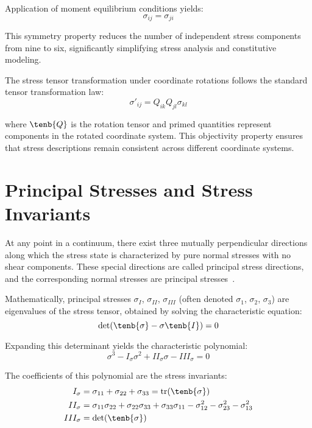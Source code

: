 Application of moment equilibrium conditions yields:
\begin{equation}
\sigma_{ij} = \sigma_{ji}
\end{equation}

This symmetry property reduces the number of independent stress components from nine to six, significantly simplifying stress analysis and constitutive modeling.

The stress tensor transformation under coordinate rotations follows the standard tensor transformation law:
\begin{equation}
\sigma'_{ij} = Q_{ik}Q_{jl}\sigma_{kl}
\end{equation}

where $\tenb{Q}$ is the rotation tensor and primed quantities represent components in the rotated coordinate system. This objectivity property ensures that stress descriptions remain consistent across different coordinate systems.

\section{Principal Stresses and Stress Invariants}

At any point in a continuum, there exist three mutually perpendicular directions along which the stress state is characterized by pure normal stresses with no shear components. These special directions are called principal stress directions, and the corresponding normal stresses are principal stresses~\autocite{Sadd.2019}.

Mathematically, principal stresses $\sigma_I$, $\sigma_{II}$, $\sigma_{III}$ (often denoted $\sigma_1$, $\sigma_2$, $\sigma_3$) are eigenvalues of the stress tensor, obtained by solving the characteristic equation:
\begin{equation}
\det(\tenb{\sigma} - \sigma \tenb{I}) = 0
\end{equation}

Expanding this determinant yields the characteristic polynomial:
\begin{equation}
\sigma^3 - I_\sigma \sigma^2 + II_\sigma \sigma - III_\sigma = 0
\end{equation}

The coefficients of this polynomial are the stress invariants:
\begin{align}
I_\sigma &= \sigma_{11} + \sigma_{22} + \sigma_{33} = \text{tr}(\tenb{\sigma})\\
II_\sigma &= \sigma_{11}\sigma_{22} + \sigma_{22}\sigma_{33} + \sigma_{33}\sigma_{11} - \sigma_{12}^2 - \sigma_{23}^2 - \sigma_{13}^2\\
III_\sigma &= \det(\tenb{\sigma})
\end{align}

